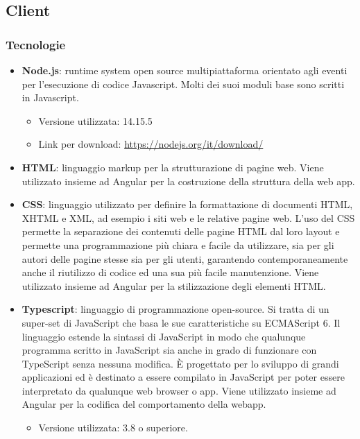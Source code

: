 \subsection{Client}

\subsubsection{Tecnologie}

\begin{itemize}
	\item \textbf{Node.js}: runtime system open source multipiattaforma orientato agli eventi per l'esecuzione di codice Javascript. Molti dei suoi moduli base sono scritti in Javascript. 
	\begin{itemize}
		\item Versione utilizzata: 14.15.5
		\item Link per download: \url{https://nodejs.org/it/download/}
	\end{itemize}
	
	\item \textbf{HTML}: linguaggio markup per la strutturazione di pagine web. Viene utilizzato insieme ad Angular per la costruzione della struttura della web app.

	\item \textbf{CSS}: linguaggio utilizzato per definire la formattazione di documenti HTML, XHTML e XML, ad esempio i siti web e le relative pagine web. L'uso del CSS permette la separazione dei contenuti delle pagine HTML dal loro layout e permette una programmazione più chiara e facile da utilizzare, sia per gli autori delle pagine stesse sia per gli utenti, garantendo contemporaneamente anche il riutilizzo di codice ed una sua più facile manutenzione. Viene utilizzato insieme ad Angular per la stilizzazione degli elementi HTML.
	\item \textbf{Typescript}: linguaggio di programmazione open-source. Si tratta di un super-set di JavaScript che basa le sue caratteristiche su ECMAScript 6. Il linguaggio estende la sintassi di JavaScript in modo che qualunque programma scritto in JavaScript sia anche in grado di funzionare con TypeScript senza nessuna modifica. È progettato per lo sviluppo di grandi applicazioni ed è destinato a essere compilato in JavaScript per poter essere interpretato da qualunque web browser o app. Viene utilizzato insieme ad Angular per la codifica del comportamento della webapp.
	\begin{itemize}
		\item Versione utilizzata: 3.8 o superiore.
	\end{itemize}

\end{itemize}

